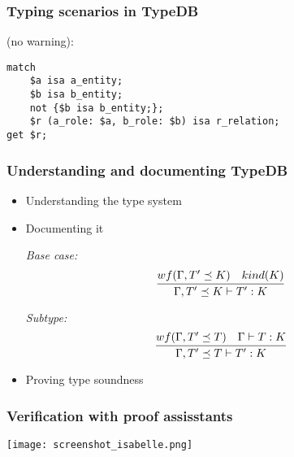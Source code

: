 \documentclass{beamer}
\begin{document}
\begin{frame}[fragile]\frametitle{Typing scenarios in TypeDB}

   (no warning):

\begin{verbatim}
match
    $a isa a_entity; 
    $b isa b_entity;
    not {$b isa b_entity;};
    $r (a_role: $a, b_role: $b) isa r_relation;
get $r;
\end{verbatim}
  
\end{frame}


\begin{frame}[fragile]\frametitle{Understanding and documenting TypeDB}

  \begin{itemize}
  \item Understanding the type system
  \item Documenting it

\emph{Base case:}
$$
\infer{\Gamma, T' \preceq K \vdash T' : K}{
  wf(\Gamma, T' \preceq K)  & kind(K)
}
$$

\emph{Subtype:}
$$
\infer{\Gamma, T' \preceq T \vdash T' : K}{
  wf(\Gamma, T' \preceq T) & \Gamma \vdash T : K 
}
$$
    
  \item Proving type soundness
  \end{itemize}

\end{frame}

  
\begin{frame}[fragile]\frametitle{Verification with proof assisstants}

\texttt{[image: screenshot\_isabelle.png]}

\end{frame}



\end{document}
